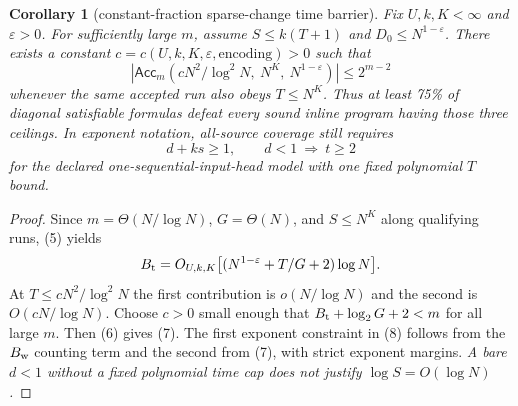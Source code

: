 \documentclass[11pt]{article}
\newtheorem{corollary}[theorem]{Corollary}
\newcommand{\Acc}{\mathsf{Acc}}
\begin{document}
\begin{corollary}[constant-fraction sparse-change time barrier]
Fix $U,k,K<\infty$ and $\varepsilon>0$.  For sufficiently large $m$,
assume $S\le k(T+1)$ and $D_0\le N^{1-\varepsilon}$. There exists a
constant $c=c(U,k,K,\varepsilon,\text{encoding})>0$ such that
\[
 |\Acc_m(cN^2/\log^2N,\ N^K,\ N^{1-\varepsilon})|
                \le 2^{m-2}
 \tag{7}
\]
whenever the same accepted run also obeys $T\le N^K$.
Thus \emph{at least 75\%} of diagonal satisfiable formulas defeat
\emph{every} sound inline program having those three ceilings.
In exponent notation, all-source coverage still requires
\[
             d+ks\ge1,\qquad
             d<1\ \Longrightarrow\ t\ge2
 \tag{8}
\]
for the declared one-sequential-input-head model with one fixed
polynomial $T$ bound.
\end{corollary}
\begin{proof}
Since $m=\Theta(N/\log N)$, $G=\Theta(N)$,
and $S\le N^K$ along qualifying runs, (5) yields
\[
 B_{\rm t}=O_{U,k,K}\bigl[
       (N^{1-\varepsilon}+T/G+2)\log N\bigr].
\]
At $T\le cN^2/\log^2N$ the first contribution is
$o(N/\log N)$ and the second is $O(cN/\log N)$.
Choose $c>0$ small enough that
$B_{\rm t}+\log_2G+2<m$ for all large $m$.
Then (6) gives (7).
The first exponent constraint in (8) follows from the
$B_{\rm w}$ counting term and the second from (7), with strict
exponent margins. \emph{A bare $d<1$ without a fixed polynomial
time cap does not justify $\log S=O(\log N)$.}
\end{proof}
\end{document}
